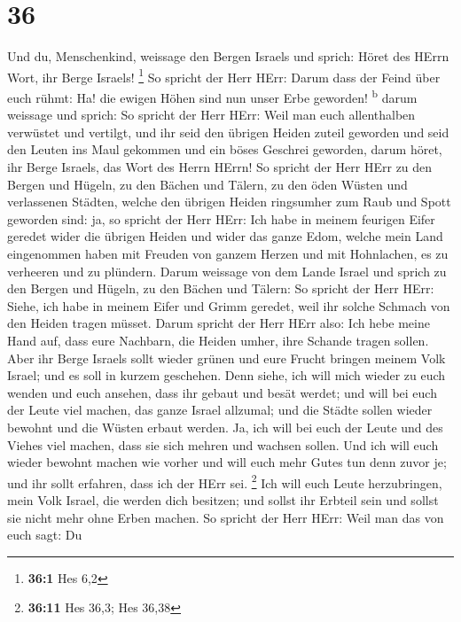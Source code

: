 \hypertarget{section-35}{%
\section{36}\label{section-35}}

 Und du, Menschenkind, weissage den Bergen Israels und
sprich: Höret des HErrn Wort, ihr Berge Israels! \footnote{\textbf{36:1}
  Hes 6,2}  So spricht der Herr HErr: Darum dass der Feind
über euch rühmt: Ha! die ewigen Höhen sind nun unser Erbe geworden!
\textsuperscript{b}  darum weissage und sprich: So spricht
der Herr HErr: Weil man euch allenthalben verwüstet und vertilgt, und
ihr seid den übrigen Heiden zuteil geworden und seid den Leuten ins Maul
gekommen und ein böses Geschrei geworden,  darum höret,
ihr Berge Israels, das Wort des Herrn HErrn! So spricht der Herr HErr zu
den Bergen und Hügeln, zu den Bächen und Tälern, zu den öden Wüsten und
verlassenen Städten, welche den übrigen Heiden ringsumher zum Raub und
Spott geworden sind:  ja, so spricht der Herr HErr: Ich
habe in meinem feurigen Eifer geredet wider die übrigen Heiden und wider
das ganze Edom, welche mein Land eingenommen haben mit Freuden von
ganzem Herzen und mit Hohnlachen, es zu verheeren und zu plündern.
 Darum weissage von dem Lande Israel und sprich zu den
Bergen und Hügeln, zu den Bächen und Tälern: So spricht der Herr HErr:
Siehe, ich habe in meinem Eifer und Grimm geredet, weil ihr solche
Schmach von den Heiden tragen müsset.  Darum spricht der
Herr HErr also: Ich hebe meine Hand auf, dass eure Nachbarn, die Heiden
umher, ihre Schande tragen sollen.  Aber ihr Berge Israels
sollt wieder grünen und eure Frucht bringen meinem Volk Israel; und es
soll in kurzem geschehen.  Denn siehe, ich will mich
wieder zu euch wenden und euch ansehen, dass ihr gebaut und besät
werdet;  und will bei euch der Leute viel machen, das
ganze Israel allzumal; und die Städte sollen wieder bewohnt und die
Wüsten erbaut werden.  Ja, ich will bei euch der Leute
und des Viehes viel machen, dass sie sich mehren und wachsen sollen. Und
ich will euch wieder bewohnt machen wie vorher und will euch mehr Gutes
tun denn zuvor je; und ihr sollt erfahren, dass ich der HErr sei.
\footnote{\textbf{36:11} Hes 36,3; Hes 36,38}  Ich will
euch Leute herzubringen, mein Volk Israel, die werden dich besitzen; und
sollst ihr Erbteil sein und sollst sie nicht mehr ohne Erben machen.
 So spricht der Herr HErr: Weil man das von euch sagt: Du
